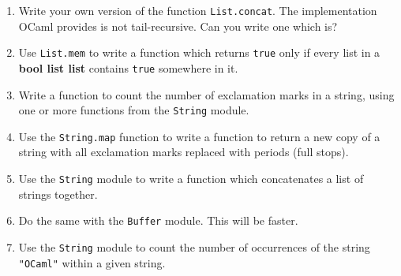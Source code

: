 \documentclass[]{book}
\begin{document}
\begin{enumerate}
  \item Write your own version of the function \texttt{List.concat}. The implementation OCaml provides is not tail-recursive. Can you write one which is?
  \item Use \texttt{List.mem} to write a function which returns \texttt{true} only if every list in a \textsf{\textbf{bool list list}} contains \texttt{true} somewhere in it.
  \item Write a function to count the number of exclamation marks in a string, using one or more functions from the \texttt{String} module.
  \item Use the \texttt{String.map} function to write a function to return a new copy of a string with all exclamation marks replaced with periods (full stops).
  \item Use the \texttt{String} module to write a function which concatenates a list of strings together.
  \item Do the same with the \texttt{Buffer} module. This will be faster.
  \item Use the \texttt{String} module to count the number of occurrences of the string \texttt{"OCaml"} within a given string.
\end{enumerate}

\cleardoublepage
\thispagestyle{empty}
\\
\end{document}
